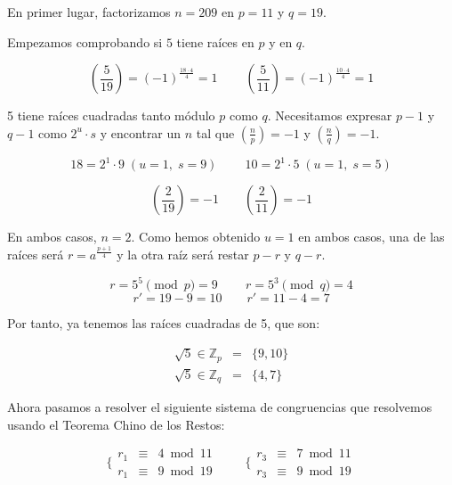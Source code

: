 \documentclass[10pt,spanish]{article}
\begin{document}
\begin{description}
    En primer lugar, factorizamos $n = 209$ en $p = 11$ y $q = 19$.

    Empezamos comprobando si $5$ tiene raíces en $p$ y en $q$.

    \begin{displaymath}
        \left(\frac{5}{19} \right) = (-1)^\frac{18 \cdot 4}{4} = 1 \qquad\ \left(\frac{5}{11} \right) = (-1)^\frac{10 \cdot 4}{4} = 1
    \end{displaymath}

    5 tiene raíces cuadradas tanto módulo $p$ como $q$. Necesitamos expresar $p-1$ y $q-1$ como $2^u \cdot s$  y encontrar un $n$ tal que $\left(\frac{n}{p} \right) = -1$ y $\left(\frac{n}{q} \right) = -1$.

    \begin{displaymath}
        18 = 2^1 \cdot 9 \; (u=1, \; s=9) \qquad\ 10 = 2^1 \cdot 5 \; (u=1, \; s=5)
    \end{displaymath}

    \begin{displaymath}
        \left(\frac{2}{19}\right) = -1 \qquad \left(\frac{2}{11}\right) = -1
    \end{displaymath}

    En ambos casos, $n = 2$. Como hemos obtenido $u = 1$ en ambos casos, una de las raíces será $r = a^{\frac{p+1}{4}}$ y la otra raíz será restar $p - r$ y $q - r$.

    \begin{displaymath}
        r = 5^5 \pmod p = 9 \qquad\ r = 5^3 \pmod q = 4
    \end{displaymath}
    \begin{displaymath}
        r' = 19 - 9 = 10 \qquad r' = 11 - 4 = 7
    \end{displaymath}

    Por tanto, ya tenemos las raíces cuadradas de 5, que son:

    \begin{displaymath}
    \begin{matrix}
        \sqrt{5} \in \mathbb{Z}_p & = & \{9,10\} \\
        \sqrt{5} \in \mathbb{Z}_q & = & \{4,7\}
    \end{matrix}
    \end{displaymath}

    Ahora pasamos a resolver el siguiente sistema de congruencias que resolvemos usando el Teorema Chino de los Restos:

    \begin{displaymath}
    \Bigg\{ \begin{matrix}
    r_1 & \equiv & 4 \bmod 11 \\
    r_1 & \equiv & 9 \bmod 19 
    \end{matrix}
    \qquad\
    \Bigg\{ 
    \begin{matrix}
    r_3 & \equiv & 7 \bmod 11 \\
    r_3 & \equiv & 9 \bmod 19
    \end{matrix}
    \end{displaymath}


\end{description}
\end{document}
